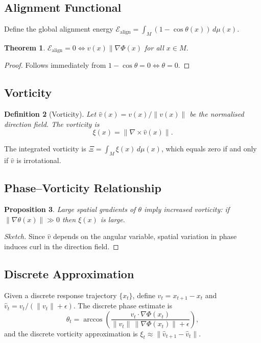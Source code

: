 \documentclass[12pt, a4paper]{article}
\newtheorem{theorem}{Theorem}[section]
\newtheorem{definition}[theorem]{Definition}
\newtheorem{proposition}[theorem]{Proposition}
\theoremstyle{remark}
\theoremstyle{definition}
\begin{document}
\subsection{Alignment Functional}

Define the global alignment energy
$\mathcal{E}_{\mathrm{align}} = \int_M (1 - \cos\theta(x))\,d\mu(x)$.

\begin{theorem}
$\mathcal{E}_{\mathrm{align}} = 0 \iff v(x) \parallel \nabla\Phi(x)$ for all $x \in M$.
\end{theorem}

\begin{proof}
Follows immediately from $1 - \cos\theta = 0 \iff \theta = 0$.
\end{proof}

\subsection{Vorticity}

\begin{definition}[Vorticity]
Let $\hat{v}(x) = v(x)/\|v(x)\|$ be the normalised direction field.  The vorticity is
\[
\xi(x) = \|\nabla \times \hat{v}(x)\|.
\]
\end{definition}

The integrated vorticity is $\Xi = \int_M \xi(x)\,d\mu(x)$, which equals zero if and only
if $\hat{v}$ is irrotational.

\subsection{Phase--Vorticity Relationship}

\begin{proposition}
Large spatial gradients of $\theta$ imply increased vorticity: if
$\|\nabla\theta(x)\| \gg 0$ then $\xi(x)$ is large.
\end{proposition}

\begin{proof}[Sketch]
Since $\hat{v}$ depends on the angular variable, spatial variation in phase induces curl in
the direction field.
\end{proof}

\subsection{Discrete Approximation}

Given a discrete response trajectory $\{x_t\}$, define $v_t = x_{t+1} - x_t$ and
$\hat{v}_t = v_t/(\|v_t\|+\epsilon)$.  The discrete phase estimate is
\[
\theta_t = \arccos\!\left(
\frac{v_t \cdot \nabla\Phi(x_t)}{\|v_t\|\,\|\nabla\Phi(x_t)\|+\epsilon}
\right),
\]
and the discrete vorticity approximation is
$\xi_t \approx \|\hat{v}_{t+1} - \hat{v}_t\|$.
\end{document}

